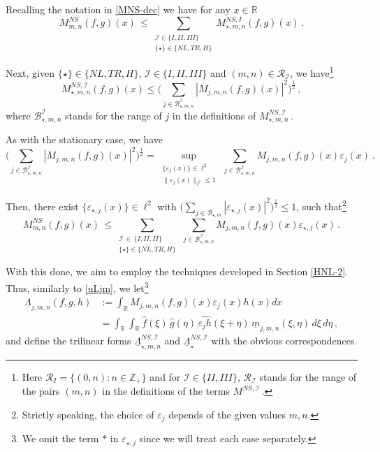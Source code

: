 \documentclass[a4paper,reqno]{amsart}
\numberwithin{equation}{section}
\theoremstyle{definition}
\newcommand{\R}{\mathbb{R}}
\newcommand{\Z}{\mathbb{Z}}
\newcommand{\e}{\varepsilon}
\newcommand{\um}{\underline{m}}
\newcommand{\uL}{\underline{\Lambda}}
\def\B{\mathcal{B}}
\def\I{\mathcal{I}}
\begin{document}
Recalling the notation in \eqref{MNS-dec} we have for any $x\in\R$
\begin{equation*}
	M^{NS}_{m,n}(f,g)(x)\,\le \sum_{\substack{\I\in\{I,II,III\}\\ \{\star\}\in\{NL,TR,H\}}}  M^{NS,I}_{\star,m,n}(f,g)(x)\,.
\end{equation*}

Next, given $\{\star\}\in\{NL,TR,H\}$, $\I\in\{I,II,III\}$ and $(m,n)\in\mathcal R_\I$, we have\footnote{Here $\mathcal R_I=\{(0,n):n\in\Z_+\}$ and for $\I\in\{II,III\}$, $\mathcal R_\I$ stands for the range of the pairs $(m,n)$ in the definitions of the terms $M^{NS,\I}$\,.}
\begin{equation}\label{MNSIstarmn-l2bound}
	M^{NS,\I}_{\star,m,n}(f,g)(x)\le\Big(\sum_{j\in\B_{\star,m,n}^\I} |M_{j,m,n}(f,g)(x)|^2\Big)^{\frac12}\,,
\end{equation}
where $\B_{\star,m,n}^\I$ stands for the range of $j$ in the definitions of $M^{NS,\I}_{\star,m,n}$\,.

As with the stationary case, we have
\begin{equation*}
	\Big(\sum_{j\in\B_{\star,m,n}^\I} |M_{j,m,n}(f,g)(x)|^2\Big)^{\frac12} =\sup_{\substack{\{\e_j(x)\}\in\ell^2\\ \|\e_j(x)\|_{\ell^2}\le 1}}\, \sum_{j\in \B_{\star,m,n}^\I} M_{j,m,n}(f,g)(x)\e_j(x)\,.
\end{equation*}

Then, there exist $\{\e_{\star,j}(x)\}\in\ell^2$ with $\big(\sum\limits_{j\in\B_{\star,m}} |\e_{\star,j}(x)|^2\big)^{\frac12}\le 1$, such that\footnote{Strictly speaking, the choice of $\e_j$ depends of the given values $m, n$. }
\begin{equation}
	M^{NS}_{m,n}(f,g)(x)\,\le \sum_{\substack{\I\,\in\,\{I,II,II\}\\\{\star\}\in\{NL,TR,H\}}}\,\sum_{j\in\B_{\star,m,n}^\I}M_{j,m,n}(f,g)(x)\e_{\star,j}(x)\,.
\end{equation}

With this done, we aim to employ the techniques developed in Section \ref{HNL-2}. Thus, similarly to \eqref{uLjm}, we let\footnote{We omit the term ${*}$ in $\e_{\star,j}$ since we will treat each case separately.}
\begin{align}
	\uL_{j,m,n}(f,g,h)&:=\int_\R M_{j,m,n}(f,g)(x)\e_j(x)h(x)dx\nonumber\\
	&=\int_\R\int_\R \hat{f}(\xi)\,\hat{g}(\eta)\,\widehat{\e_j h}(\xi+\eta) \,\um_{j,m,n}(\xi,\eta)\,d\xi\,d\eta\,,
\end{align}
and define the trilinear forms $\uL^{NS,\I}_{\star,m,n}$ and $\uL^{NS,\I}_{\star}$ with the obvious correspondences.
\end{document}
